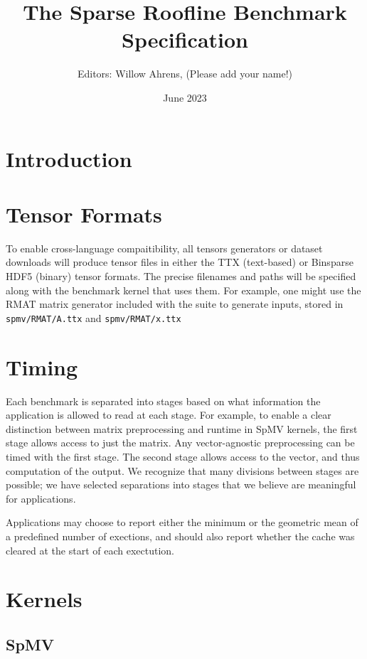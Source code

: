 \documentclass{article}
\title{The Sparse Roofline Benchmark Specification}
\author{Editors: Willow Ahrens, (Please add your name!)}
\date{June 2023}
\begin{document}
\maketitle

\section{Introduction}

\section{Tensor Formats}

To enable cross-language compaitibility, all tensors generators or dataset downloads will produce tensor files in either the TTX (text-based) or Binsparse HDF5 (binary) tensor formats. The precise filenames and paths will be specified along with the benchmark kernel that uses them. For example, one might use the RMAT matrix generator included with the suite to generate inputs, stored in \texttt{spmv/RMAT/A.ttx} and \texttt{spmv/RMAT/x.ttx}

\section{Timing}

Each benchmark is separated into stages based on what information the application is allowed to read at each stage. For example, to enable a clear distinction between matrix preprocessing and runtime in SpMV kernels, the first stage allows access to just the matrix. Any vector-agnostic preprocessing can be timed with the first stage. The second stage allows access to the vector, and thus computation of the output. We recognize that many divisions between stages are possible; we have selected separations into stages that we believe are meaningful for applications.

Applications may choose to report either the minimum or the geometric mean of a predefined number of exections, and should also report whether the cache was cleared at the start of each exectution.

\section{Kernels}

\subsection{SpMV}
\end{document}
